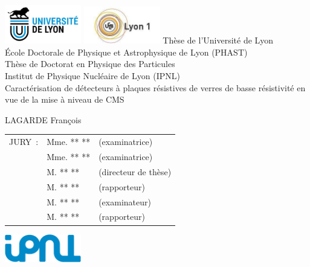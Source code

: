 \thispagestyle{empty}
\begin{center}	
	\includegraphics[width=0.25\textwidth]{MPG/logo_lyon1.jpg}
	\hspace{5cm}
	\includegraphics[width=0.25\textwidth]{MPG/logo_ucbl_lyon1.jpg}
	\hfill
	\vfill
	Thèse de l'Université de Lyon \\
	\bigskip
	École Doctorale de Physique et Astrophysique de Lyon (PHAST)\\[1em]
	\bigskip
	Thèse de Doctorat en Physique des Particules \\
	\bigskip
	Institut de Physique Nucléaire de Lyon (IPNL)\\
	\vfill
	\Huge Caractérisation de détecteurs à plaques résistives de verres de basse résistivité en vue de la mise à niveau de CMS
	\vspace{10mm}
	\normalsize
	
	\textsc{LAGARDE} François
	\vfill
	\begin{tabular}{lll}
		JURY~: & Mme. ** \textsc{**} & (examinatrice)\\
		& Mme. ** \textsc{**}       & (examinatrice)\\
		& M.  **  \textsc{**}         & (directeur de thèse)\\
		& M.  ** \textsc{**}     & (rapporteur)\\
		& M.  ** \textsc{**}            & (examinateur)\\
		& M.  ** \textsc{**}     & (rapporteur)\\
	\end{tabular}
	\vfill
	\includegraphics[width=0.25\textwidth]{MPG/Logo_IPNL.jpg}
	\vspace{2cm}
\end{center} 
\restoregeometry
